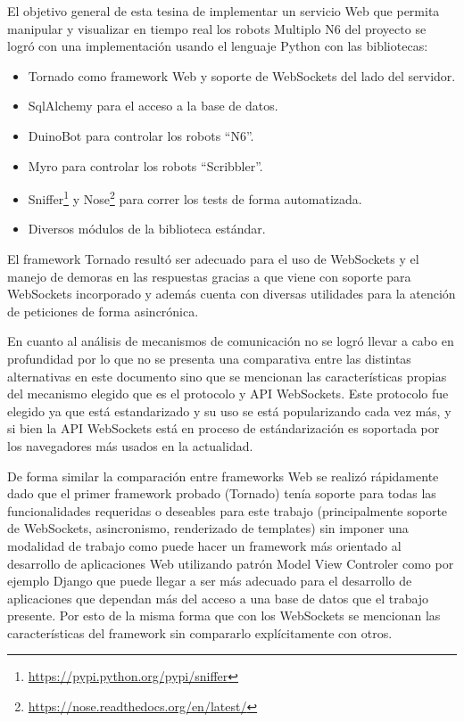 El objetivo general de esta tesina de implementar un servicio Web que permita
manipular y visualizar en tiempo real los robots Multiplo N6 del proyecto
\proyecto{} se logró con una implementación usando el lenguaje Python con
las bibliotecas:

\begin{itemize}
    \item Tornado como framework Web y soporte de WebSockets del lado del
    servidor.
    \item SqlAlchemy para el acceso a la base de datos.
    \item DuinoBot para controlar los robots ``N6''.
    \item Myro para controlar los robots ``Scribbler''.
    \item Sniffer\footnote{\url{https://pypi.python.org/pypi/sniffer}} y
    Nose\footnote{\url{https://nose.readthedocs.org/en/latest/}} para correr
    los tests de forma automatizada.
    \item Diversos módulos de la biblioteca estándar.
\end{itemize}

El framework Tornado resultó ser adecuado para el uso de WebSockets y el manejo
de demoras en las respuestas gracias a que viene con soporte para WebSockets
incorporado y además cuenta con diversas utilidades para la atención de peticiones
de forma asincrónica.

En cuanto al análisis de mecanismos de comunicación no se logró llevar a cabo
en profundidad por lo que no se presenta una comparativa entre las distintas
alternativas en este documento sino que se mencionan las características propias
del mecanismo elegido que es el protocolo y API WebSockets. Este protocolo fue
elegido ya que está estandarizado y su uso se está popularizando cada vez más,
y si bien la API WebSockets está en proceso de estándarización es soportada
por los navegadores más usados en la actualidad.

De forma similar la comparación entre frameworks Web se realizó rápidamente
dado que el primer framework probado (Tornado) tenía soporte para todas
las funcionalidades requeridas o deseables para este trabajo (principalmente
soporte de WebSockets, asincronismo, renderizado de templates) sin imponer
una modalidad de trabajo como puede hacer un framework más orientado al
desarrollo de aplicaciones Web utilizando patrón Model View Controler
como por ejemplo Django que puede llegar a ser más adecuado para el desarrollo
de aplicaciones que dependan más del acceso a una base de datos que el
trabajo presente. Por esto de la misma forma que con los WebSockets se mencionan
las características del framework sin compararlo explícitamente con otros.

